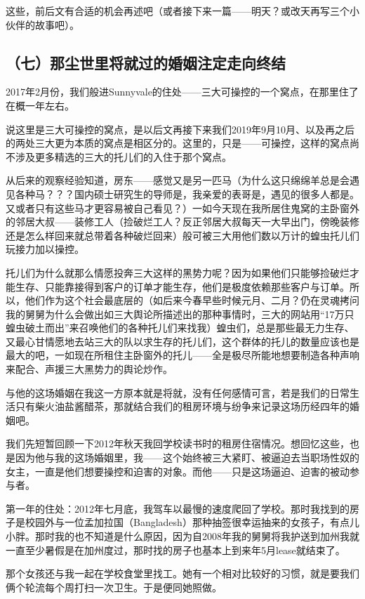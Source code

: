 \documentclass[9pt, b5paper]{article}
\begin{document}
这些，前后文有合适的机会再述吧（或者接下来一篇——明天？或改天再写三个小伙伴的故事吧）。

\subsection{（七）那尘世里将就过的婚姻注定走向终结}
\label{sec:org0681558}

2017年2月份，我们般进Sunnyvale的住处——三大可操控的一个窝点，在那里住了在概一年左右。

说这里是三大可操控的窝点，是以后文再接下来我们2019年9月10月、以及再之后的两处三大更为本质的窝点是相区分的。这里的，只是——可操控，这样的窝点尚不涉及更多精选的三大的托儿们的入住于那个窝点。 

从后来的观察经验知道，房东——感觉又是另一匹马（为什么这只绵绵羊总是会遇见各种马？？？国内硕士研究生的导师是，我亲爱的表哥是，遇见的很多人都是。又或者只有这些马才更容易被自己看见？）一如今天现在我所居住鬼窝的主卧窗外的邻居大叔——装修工人（捡破烂工人？反正邻居大叔每天一大早出门，傍晚装修还是怎么样回来就总带着各种破烂回来）般可被三大用他们数以万计的蝗虫托儿们玩接力加以操控。

托儿们为什么就那么情愿投奔三大这样的黑势力呢？因为如果他们只能够捡破烂才能生存、只能靠接得到客户的订单才能生存，他们是极度依赖那些客户与订单。所以，他们作为这个社会最底层的（如后来今春早些时候元月、二月？仍在灵魂拷问我的舅舅为什么会做出如三大舆论所描述出的那种事情时，三大的网站用“17万只蝗虫破土而出”来召唤他们的各种托儿们来找我）蝗虫们，总是那些最无力生存、又最心甘情愿地去站三大的队以求生存的托儿们，这个群体的托儿的数量应该也是最大的吧，一如现在所租住主卧窗外的托儿——全是极尽所能地想要制造各种声响来配合、声援三大黑势力的舆论炒作。

与他的这场婚姻在我这一方原本就是将就，没有任何感情可言，若是我们的日常生活只有柴火油盐酱醋茶，那就结合我们的租房环境与纷争来记录这场历经四年的婚姻吧。 

我们先短暂回顾一下2012年秋天我回学校读书时的租房住宿情况。想回忆这些，也是因为他与我的这场婚姻里，我——这个始终被三大紧盯、被逼迫去当职场性奴的女主，一直是他们想要操控和迫害的对象。而他——只是这场逼迫、迫害的被动参与者。 

第一年的住处：2012年七月底，我驾车以最慢的速度爬回了学校。那时我找到的房子是校园外与一位孟加拉国（Bangladesh）那种抽签很幸运抽来的女孩子，有点儿小胖。那时我的也不知道是什么原因，因为自2008年我的舅舅将我护送到加州我就一直至少暑假是在加州度过，那时找的房子也基本上到来年5月lease就结束了。

那个女孩还与我一起在学校食堂里找工。她有一个相对比较好的习惯，就是要我们俩个轮流每个周打扫一次卫生。于是便同她照做。
\end{document}
